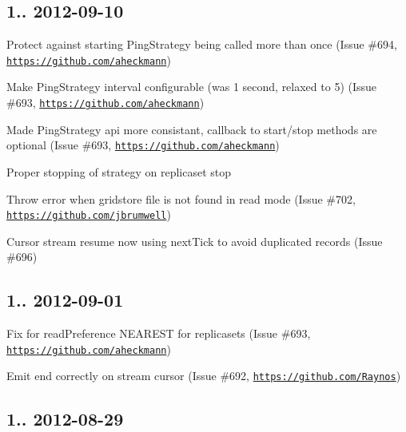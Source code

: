 \subsection*{1.. 2012-\/09-\/10 }


\begin{DoxyItemize}
\item Protect against starting Ping\+Strategy being called more than once (Issue \#694, \href{https://github.com/aheckmann}{\tt https\+://github.\+com/aheckmann})
\item Make Ping\+Strategy interval configurable (was 1 second, relaxed to 5) (Issue \#693, \href{https://github.com/aheckmann}{\tt https\+://github.\+com/aheckmann})
\item Made Ping\+Strategy api more consistant, callback to start/stop methods are optional (Issue \#693, \href{https://github.com/aheckmann}{\tt https\+://github.\+com/aheckmann})
\item Proper stopping of strategy on replicaset stop
\item Throw error when gridstore file is not found in read mode (Issue \#702, \href{https://github.com/jbrumwell}{\tt https\+://github.\+com/jbrumwell})
\item Cursor stream resume now using next\+Tick to avoid duplicated records (Issue \#696)
\end{DoxyItemize}

\subsection*{1.. 2012-\/09-\/01 }


\begin{DoxyItemize}
\item Fix for read\+Preference N\+E\+A\+R\+E\+ST for replicasets (Issue \#693, \href{https://github.com/aheckmann}{\tt https\+://github.\+com/aheckmann})
\item Emit end correctly on stream cursor (Issue \#692, \href{https://github.com/Raynos}{\tt https\+://github.\+com/\+Raynos})
\end{DoxyItemize}

\subsection*{1.. 2012-\/08-\/29 }


